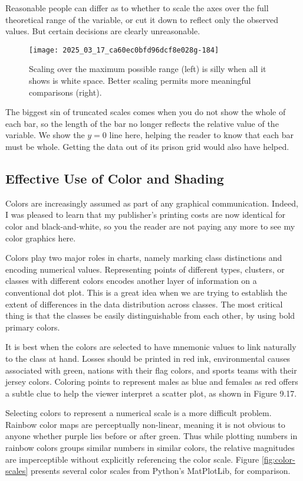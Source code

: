 \documentclass[10pt]{article}
\begin{document}
Reasonable people can differ as to whether to scale the axes over the full theoretical range of the variable, or cut it down to reflect only the observed values. But certain decisions are clearly unreasonable.

\begin{figure}[h]
  \centering
  \texttt{[image: 2025\_03\_17\_ca60ec0bfd96dcf8e028g-184]}
  \caption{Scaling over the maximum possible range (left) is silly when all it shows is white space. Better scaling permits more meaningful comparisons (right).}
  \label{fig:scaling}
\end{figure}

The biggest sin of truncated scales comes when you do not show the whole of each bar, so the length of the bar no longer reflects the relative value of the variable. We show the $y=0$ line here, helping the reader to know that each bar must be whole. Getting the data out of its prison grid would also have helped.

\subsection{Effective Use of Color and Shading}
Colors are increasingly assumed as part of any graphical communication. Indeed, I was pleased to learn that my publisher's printing costs are now identical for color and black-and-white, so you the reader are not paying any more to see my color graphics here.

Colors play two major roles in charts, namely marking class distinctions and encoding numerical values. Representing points of different types, clusters, or classes with different colors encodes another layer of information on a conventional dot plot. This is a great idea when we are trying to establish the extent of differences in the data distribution across classes. The most critical thing is that the classes be easily distinguishable from each other, by using bold primary colors.

It is best when the colors are selected to have mnemonic values to link naturally to the class at hand. Losses should be printed in red ink, environmental causes associated with green, nations with their flag colors, and sports teams with their jersey colors. Coloring points to represent males as blue and females as red offers a subtle clue to help the viewer interpret a scatter plot, as shown in Figure 9.17.

Selecting colors to represent a numerical scale is a more difficult problem. Rainbow color maps are perceptually non-linear, meaning it is not obvious to anyone whether purple lies before or after green. Thus while plotting numbers in rainbow colors groups similar numbers in similar colors, the relative magnitudes are imperceptible without explicitly referencing the color scale. Figure \ref{fig:color-scales} presents several color scales from Python's MatPlotLib, for comparison.
\end{document}
